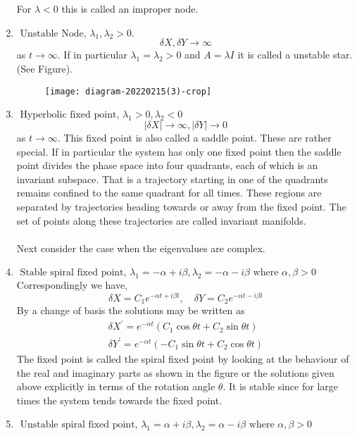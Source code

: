 \begin{enumerate}
	For $\lambda<0$ this is called an improper node.
	\item \textbf{$\text { Unstable Node, } \lambda_{1}, \lambda_{2}>0 \text {. }$}
	$$\delta X, \delta Y \rightarrow \infty$$
	as $t \rightarrow \infty .$ If in particular $\lambda_{1}=\lambda_{2}>0$ and $A=\lambda I$ it is called a unstable star.
	(See Figure).\\
	\begin{figure}[H]
		\centering
		\texttt{[image: diagram-20220215(3)-crop]}
		\caption{}
		\label{}
	\end{figure}
	\item \textbf{$\text { Hyperbolic fixed point, } \lambda_{1}>0, \lambda_{2}<0 $}
	$$|\delta X| \rightarrow \infty,|\delta Y| \rightarrow 0$$
	as $t \rightarrow \infty$. This fixed point is also called a saddle point. These are rather special. If in particular the system has only one fixed point then the saddle point divides the phase space into four quadrants, each of which is an invariant subspace. That is a trajectory starting in one of the quadrants remains confined to the same quadrant for all times. These regions are separated by trajectories heading towards or away from the fixed point. The set of points along these trajectories are called invariant manifolds.\\\\
	Next consider the case when the eigenvalues are complex.
	\item \textbf{$\text { Stable spiral fixed point, } \lambda_{1}=-\alpha+i \beta, \lambda_{2}=-\alpha-i \beta \text { where } \alpha, \beta>0$}
	Correspondingly we have,
	$$
	\delta X=C_{1} e^{-\alpha t+i \beta t}, \quad \delta Y=C_{2} e^{-\alpha t-i \beta t}
	$$
	By a change of basis the solutions may be written as
	$$
	\begin{gathered}
	\delta X^{\prime}=e^{-\alpha t}\left(C_{1} \cos \theta t+C_{2} \sin \theta t\right) \\
	\delta Y^{\prime}=e^{-\alpha t}\left(-C_{1} \sin \theta t+C_{2} \cos \theta t\right)
	\end{gathered}
	$$
	The fixed point is called the spiral fixed point by looking at the behaviour of the real and imaginary parts as shown in the figure or the solutions given above explicitly in terms of the rotation angle $\theta$. It is stable since for large times the system tends towards the fixed point.
	\item \textbf{$\text { Unstable spiral fixed point, } \lambda_{1}=\alpha+i \beta, \lambda_{2}=\alpha-i \beta \text { where } \alpha, \beta>0 $}

\end{enumerate}
